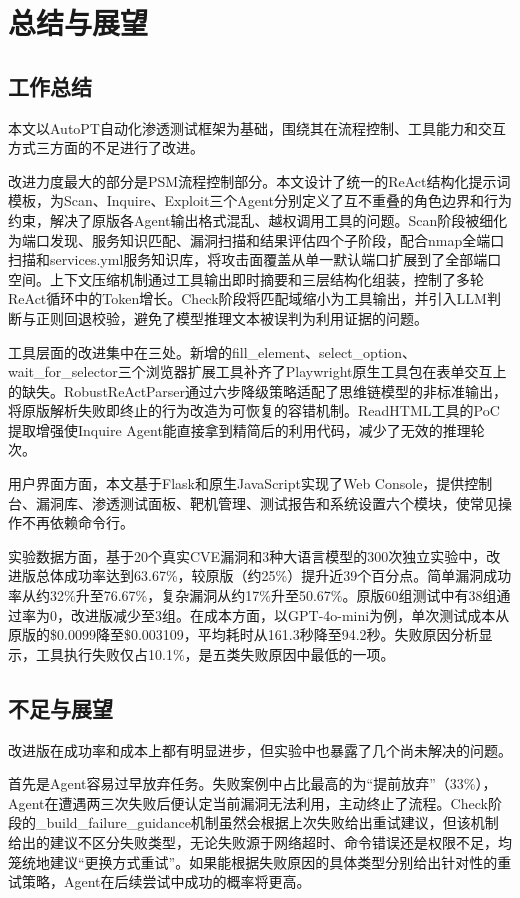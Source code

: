 \chapter{总结与展望}

\section{工作总结}

本文以AutoPT自动化渗透测试框架为基础，围绕其在流程控制、工具能力和交互方式三方面的不足进行了改进。

改进力度最大的部分是PSM流程控制部分。本文设计了统一的ReAct结构化提示词模板，为Scan、Inquire、Exploit三个Agent分别定义了互不重叠的角色边界和行为约束，解决了原版各Agent输出格式混乱、越权调用工具的问题。Scan阶段被细化为端口发现、服务知识匹配、漏洞扫描和结果评估四个子阶段，配合nmap全端口扫描和services.yml服务知识库，将攻击面覆盖从单一默认端口扩展到了全部端口空间。上下文压缩机制通过工具输出即时摘要和三层结构化组装，控制了多轮ReAct循环中的Token增长。Check阶段将匹配域缩小为工具输出，并引入LLM判断与正则回退校验，避免了模型推理文本被误判为利用证据的问题。

工具层面的改进集中在三处。新增的fill\_element、select\_option、wait\_for\_selector三个浏览器扩展工具补齐了Playwright原生工具包在表单交互上的缺失。RobustReActParser通过六步降级策略适配了思维链模型的非标准输出，将原版解析失败即终止的行为改造为可恢复的容错机制。ReadHTML工具的PoC提取增强使Inquire Agent能直接拿到精简后的利用代码，减少了无效的推理轮次。

用户界面方面，本文基于Flask和原生JavaScript实现了Web Console，提供控制台、漏洞库、渗透测试面板、靶机管理、测试报告和系统设置六个模块，使常见操作不再依赖命令行。

实验数据方面，基于20个真实CVE漏洞和3种大语言模型的300次独立实验中，改进版总体成功率达到63.67\%，较原版（约25\%）提升近39个百分点。简单漏洞成功率从约32\%升至76.67\%，复杂漏洞从约17\%升至50.67\%。原版60组测试中有38组通过率为0，改进版减少至3组。在成本方面，以GPT-4o-mini为例，单次测试成本从原版的\$0.0099降至\$0.003109，平均耗时从161.3秒降至94.2秒。失败原因分析显示，工具执行失败仅占10.1\%，是五类失败原因中最低的一项。

\section{不足与展望}

改进版在成功率和成本上都有明显进步，但实验中也暴露了几个尚未解决的问题。

首先是Agent容易过早放弃任务。失败案例中占比最高的为“提前放弃”（33\%），Agent在遭遇两三次失败后便认定当前漏洞无法利用，主动终止了流程。Check阶段的\_build\_failure\_guidance机制虽然会根据上次失败给出重试建议，但该机制给出的建议不区分失败类型，无论失败源于网络超时、命令错误还是权限不足，均笼统地建议“更换方式重试”。如果能根据失败原因的具体类型分别给出针对性的重试策略，Agent在后续尝试中成功的概率将更高。

